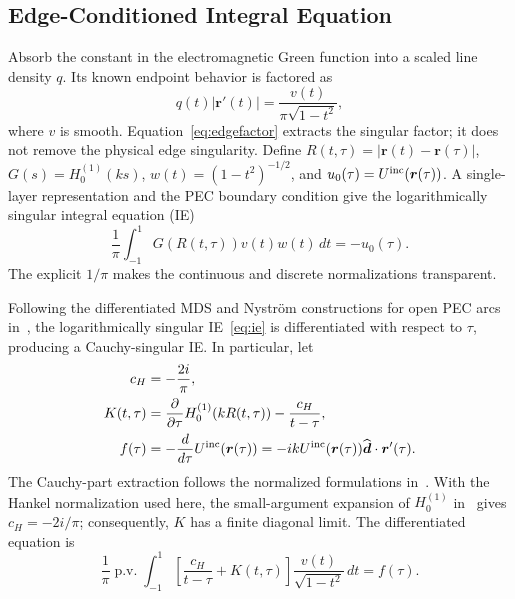 \documentclass[conference]{IEEEtran}
\begin{document}
\subsection{Edge-Conditioned Integral Equation}

Absorb the constant in the electromagnetic Green function into a scaled line
density $q$.  Its known endpoint behavior is factored as
\begin{equation}
 q(t)|\boldsymbol r'(t)|
 =\frac{v(t)}{\pi\sqrt{1-t^2}},
 \label{eq:edgefactor}
\end{equation}
where $v$ is smooth.  Equation~\eqref{eq:edgefactor} extracts the singular
factor; it does not remove the physical edge singularity.  Define
$R(t,\tau)=|\boldsymbol r(t)-\boldsymbol r(\tau)|$,
$G(s)=H_0^{(1)}(ks)$, $w(t)=(1-t^2)^{-1/2}$, and
$u_0(\tau)=U^{\rm inc}(\boldsymbol r(\tau))$.  A single-layer representation
and the PEC boundary condition give the logarithmically singular integral
equation (IE)
\begin{equation}
 \frac{1}{\pi}\int_{-1}^{1}G(R(t,\tau))v(t)w(t)\,dt=-u_0(\tau).
 \label{eq:ie}
\end{equation}
The explicit $1/\pi$ makes the continuous and discrete normalizations
transparent.

Following the differentiated MDS and Nystr\"om constructions for open PEC arcs
in~\cite{nosich2005,nosich2007,gandel2010}, the logarithmically singular
IE~\eqref{eq:ie} is differentiated with respect to $\tau$, producing a
Cauchy-singular IE.  In particular, let
\begin{align}
 c_H&=-\frac{2i}{\pi},                                                   \label{eq:ch}\\
 K(t,\tau)&=\frac{\partial}{\partial\tau}
 H_0^{(1)}\!\left(kR(t,\tau)\right)-\frac{c_H}{t-\tau},                 \label{eq:kernel}\\
 f(\tau)&=-\frac{d}{d\tau}U^{\rm inc}(\boldsymbol r(\tau))
 =-ikU^{\rm inc}(\boldsymbol r(\tau))
 \widehat{\boldsymbol d}\mathbin{\cdot}\boldsymbol r'(\tau).
 \label{eq:rhs}
\end{align}
The Cauchy-part extraction follows the normalized formulations
in~\cite{nosich2005,nosich2007}.  With the Hankel normalization used here, the
small-argument expansion of $H_0^{(1)}$ in~\cite{shapoval2011} gives
$c_H=-2i/\pi$; consequently, $K$ has a finite diagonal limit.  The
differentiated equation is
\begin{equation}
 \frac{1}{\pi}\operatorname{p.v.}\!\int_{-1}^{1}
 \left[\frac{c_H}{t-\tau}+K(t,\tau)\right]
 \frac{v(t)}{\sqrt{1-t^2}}\,dt=f(\tau).
 \label{eq:cauchyie}
\end{equation}
\end{document}
